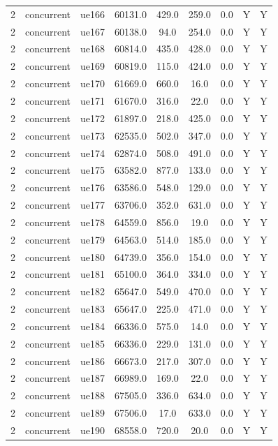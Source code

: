 \begin{table}[ht]
\begin{tabular}{|c|c|c|c|c|c|c|c|c|}
2 & concurrent & ue166 & 60131.0 & 429.0 & 259.0 & 0.0 & Y & Y \\
2 & concurrent & ue167 & 60138.0 & 94.0 & 254.0 & 0.0 & Y & Y \\
2 & concurrent & ue168 & 60814.0 & 435.0 & 428.0 & 0.0 & Y & Y \\
2 & concurrent & ue169 & 60819.0 & 115.0 & 424.0 & 0.0 & Y & Y \\
2 & concurrent & ue170 & 61669.0 & 660.0 & 16.0 & 0.0 & Y & Y \\
2 & concurrent & ue171 & 61670.0 & 316.0 & 22.0 & 0.0 & Y & Y \\
2 & concurrent & ue172 & 61897.0 & 218.0 & 425.0 & 0.0 & Y & Y \\
2 & concurrent & ue173 & 62535.0 & 502.0 & 347.0 & 0.0 & Y & Y \\
2 & concurrent & ue174 & 62874.0 & 508.0 & 491.0 & 0.0 & Y & Y \\
2 & concurrent & ue175 & 63582.0 & 877.0 & 133.0 & 0.0 & Y & Y \\
2 & concurrent & ue176 & 63586.0 & 548.0 & 129.0 & 0.0 & Y & Y \\
2 & concurrent & ue177 & 63706.0 & 352.0 & 631.0 & 0.0 & Y & Y \\
2 & concurrent & ue178 & 64559.0 & 856.0 & 19.0 & 0.0 & Y & Y \\
2 & concurrent & ue179 & 64563.0 & 514.0 & 185.0 & 0.0 & Y & Y \\
2 & concurrent & ue180 & 64739.0 & 356.0 & 154.0 & 0.0 & Y & Y \\
2 & concurrent & ue181 & 65100.0 & 364.0 & 334.0 & 0.0 & Y & Y \\
2 & concurrent & ue182 & 65647.0 & 549.0 & 470.0 & 0.0 & Y & Y \\
2 & concurrent & ue183 & 65647.0 & 225.0 & 471.0 & 0.0 & Y & Y \\
2 & concurrent & ue184 & 66336.0 & 575.0 & 14.0 & 0.0 & Y & Y \\
2 & concurrent & ue185 & 66336.0 & 229.0 & 131.0 & 0.0 & Y & Y \\
2 & concurrent & ue186 & 66673.0 & 217.0 & 307.0 & 0.0 & Y & Y \\
2 & concurrent & ue187 & 66989.0 & 169.0 & 22.0 & 0.0 & Y & Y \\
2 & concurrent & ue188 & 67505.0 & 336.0 & 634.0 & 0.0 & Y & Y \\
2 & concurrent & ue189 & 67506.0 & 17.0 & 633.0 & 0.0 & Y & Y \\
2 & concurrent & ue190 & 68558.0 & 720.0 & 20.0 & 0.0 & Y & Y \\

\end{tabular}
\end{table}
